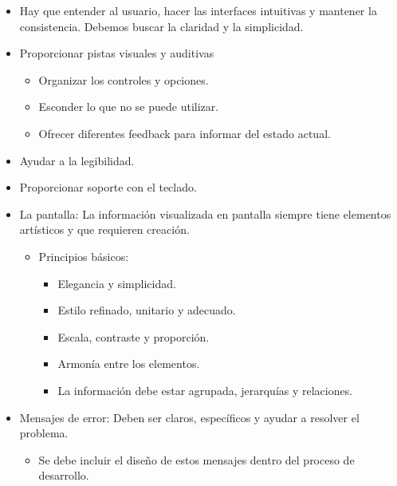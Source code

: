 \documentclass[12pt, twoside, openright]{report} %
\begin{document}
\begin{itemize}
	\item Hay que entender al usuario, hacer las interfaces intuitivas y
	      mantener la consistencia. Debemos buscar la claridad y la
	      simplicidad.
	\item Proporcionar pistas visuales y auditivas

	      \begin{itemize}
		      \item Organizar los controles y opciones.

		      \item Esconder lo que no se puede utilizar.

		      \item Ofrecer diferentes feedback para informar del estado actual.
	      \end{itemize}
	\item Ayudar a la legibilidad.
	\item Proporcionar soporte con el teclado.
	      \pagebreak
	\item La pantalla: La información visualizada en pantalla siempre tiene
	      elementos artísticos y que requieren creación.

	      \begin{itemize}
		      \item Principios básicos:

		            \begin{itemize}
			            \item Elegancia y simplicidad.

			            \item Estilo refinado, unitario y adecuado.

			            \item Escala, contraste y proporción.

			            \item Armonía entre los elementos.

			            \item La información debe estar agrupada, jerarquías y relaciones.
		            \end{itemize}
	      \end{itemize}
	\item Mensajes de error: Deben ser claros, específicos y ayudar a resolver
	      el problema.

	      \begin{itemize}
		      \item Se debe incluir el diseño de estos mensajes dentro del proceso de
		            desarrollo.


\end{itemize}
\end{itemize}
\end{document}
